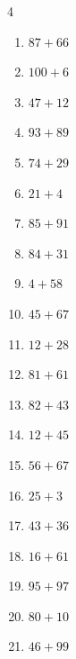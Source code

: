 \begin{multicols}{4}
\begin{enumerate}
  \item $87+66$
        \phantom{$=153$}

  \item $100+6$
        \phantom{$=106$}

  \item $47+12$
        \phantom{$=59$}

  \item $93+89$
        \phantom{$=182$}

  \item $74+29$
        \phantom{$=103$}

  \item $21+4$
        \phantom{$=25$}

  \item $85+91$
        \phantom{$=176$}

  \item $84+31$
        \phantom{$=115$}

  \item $4+58$
        \phantom{$=62$}

  \item $45+67$
        \phantom{$=112$}

  \item $12+28$
        \phantom{$=40$}

\columnbreak %

  \item $81+61$
        \phantom{$=142$}

  \item $82+43$
        \phantom{$=125$}

  \item $12+45$
        \phantom{$=57$}

  \item $56+67$
        \phantom{$=123$}

  \item $25+3$
        \phantom{$=28$}

  \item $43+36$
        \phantom{$=79$}

  \item $16+61$
        \phantom{$=77$}

  \item $95+97$
        \phantom{$=192$}

  \item $80+10$
        \phantom{$=90$}

  \item $46+99$
        \phantom{$=145$}


\end{enumerate}
\end{multicols}
